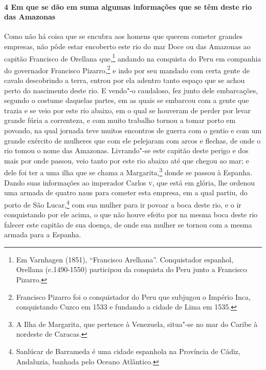 \begin{linenumbers}
\paragraph{4 Em que se dão em suma algumas informações que se têm deste rio das Amazonas} \quad
Como não há coisa que se encubra aos homens que querem cometer grandes empresas, não pôde
estar encoberto este rio do mar Doce ou das Amazonas ao capitão Francisco de Orellana
que,\footnote{ Em Varnhagen (1851), ``Francisco Arelhana''. Conquistador espanhol,
Orellana (c.1490-1550) participou da conquista do Peru junto a Francisco Pizarro.} andando
na conquista do Peru em companhia do governador Francisco Pizarro,\footnote{ Francisco
Pizarro foi o conquistador do Peru que subjugou o Império Inca, conquistando Cuzco em 1533
e fundando a cidade de Lima em 1535.} e indo por seu mandado com certa gente de cavalo
descobrindo a terra, entrou por ela adentro tanto espaço que se achou perto do nascimento
deste rio. E vendo"-o caudaloso, fez junto dele embarcações, segundo o costume daquelas
partes, em as quais se embarcou com a gente que trazia e se veio por este rio abaixo, em o
qual se houveram de perder por levar grande fúria a correnteza, e com muito trabalho
tornou a tomar porto em povoado, na qual jornada teve muitos encontros de guerra com o
gentio e com um grande exército de mulheres que com ele pelejaram com arcos e flechas, de
onde o rio tomou o nome das Amazonas. Livrando"-se este capitão deste perigo e dos mais por
onde passou, veio tanto por este rio abaixo até que chegou ao mar; e dele foi ter a uma
ilha que se chama a Margarita,\footnote{ A Ilha de Margarita, que pertence à Venezuela,
situa"-se no mar do Caribe à nordeste de Caracas.} donde se passou à Espanha. Dando suas
informações ao imperador Carlos \textsc{v}, que está em glória, lhe ordenou uma armada de
quatro naus para cometer esta empresa, em a qual partiu, do porto de São Lucar,\footnote{
Sanlúcar de Barrameda é uma cidade espanhola na Província de Cádiz, Andaluzia, banhada
pelo Oceano Atlântico.} com sua mulher para ir povoar a boca deste rio, e o ir
conquistando por ele acima, o que não houve efeito por na mesma boca deste rio falecer
este capitão de sua doença, de onde sua mulher se tornou com a mesma armada para a
Espanha.


\end{linenumbers}
